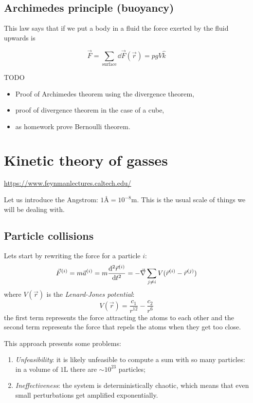 \documentclass[12pt]{extarticle}
\begin{document}
\subsection{Archimedes principle (buoyancy)}

This law says that if we put a body in a fluid the force exerted by the fluid upwards is

\begin{equation}
    \vec F = \sum_{\text{surface}} \dd{\vec F}(\vec r) = pgV \hat k
\end{equation}

TODO
\begin{itemize}
    \item
          Proof of Archimedes theorem using the divergence theorem,
    \item
          proof of divergence theorem in the case of a cube,
    \item
          as homework prove Bernoulli theorem.
\end{itemize}

\section{Kinetic theory of gasses}

\url{https://www.feynmanlectures.caltech.edu/}

Let us introduce the Angstrom: $1 \si{\angstrom} = 10^{-8} \si{\meter}$. This is the usual scale of things we will be dealing with.

\subsection{Particle collisions}

Lets start by rewriting the force for a particle $i$:
\begin{equation}
    \vec F^{(i)} = m \vec a^{(i)} = m \dv[2]{\vec r^{(i)}}{t} = - \vec \nabla \sum_{j \ne i} V(\vec r^{(i)} - \vec r^{(j)})
\end{equation}
where $V(\vec r)$ is the \emph{Lenard-Jones potential}:
\begin{equation}
    V(\vec r) = \frac{c_1}{r^{12}} - \frac{c_2}{r^6}
\end{equation}
the first term represents the force attracting the atoms to each other and the second term represents the force that repels the atoms when they get too close.

This approach presents some problems:
\begin{enumerate}
    \item \emph{Unfeasibility}: it is likely unfeasible to compute a sum with so many particles: in a volume of $1 \si{\liter}$ there are $\sim 10^{23}$ particles;
    \item \emph{Ineffectiveness}: the system is deterministically chaotic, which means that even small perturbations get amplified exponentially.
\end{enumerate}
\end{document}

